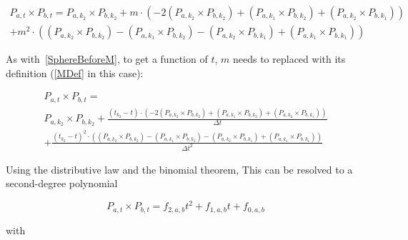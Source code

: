 \begin{equation}
    \begin{split}
        P_{a, t} \times P_{b, t} =
        P_{a, k_2} \times P_{b, k_2}
        + m \cdot (
        - 2 (P_{a, k_2} \times P_{b, k_2})
        + (P_{a, k_1} \times P_{b, k_2})
        + (P_{a, k_2} \times P_{b, k_1})
        )
        \\
        + m^2 \cdot (
        (P_{a, k_2} \times P_{b, k_2})
        - (P_{a, k_1} \times P_{b, k_2})
        - (P_{a, k_2} \times P_{b, k_1})
        + (P_{a, k_1} \times P_{b, k_1})
        )
    \end{split}
\end{equation}

As with~\eqref{SphereBeforeM}, to get a function of \(t\),
\(m\) needs to replaced with its definition (\eqref{MDef} in this case):

\begin{multline*}
    P_{a, t} \times P_{b, t} =
    \\
    P_{a, k_2} \times P_{b, k_2}
    + \frac{(t_{k_2} - t) \cdot (
        - 2 (P_{a, k_2} \times P_{b, k_2})
        + (P_{a, k_1} \times P_{b, k_2})
        + (P_{a, k_2} \times P_{b, k_1})
        )}{\Delta t}
    \\
    + \frac{{(t_{k_2} - t)}^2 \cdot (
        (P_{a, k_2} \times P_{b, k_2})
        - (P_{a, k_1} \times P_{b, k_2})
        - (P_{a, k_2} \times P_{b, k_1})
        + (P_{a, k_1} \times P_{b, k_1})
        )}{\Delta t^2}
\end{multline*}

Using the distributive law and the binomial theorem,
This can be resolved to a second-degree polynomial

\begin{equation}\label{SurfaceCrossPoly}
    P_{a, t} \times P_{b, t} = f_{2, a, b}t^2 + f_{1, a, b}t + f_{0, a, b}
\end{equation}

with

